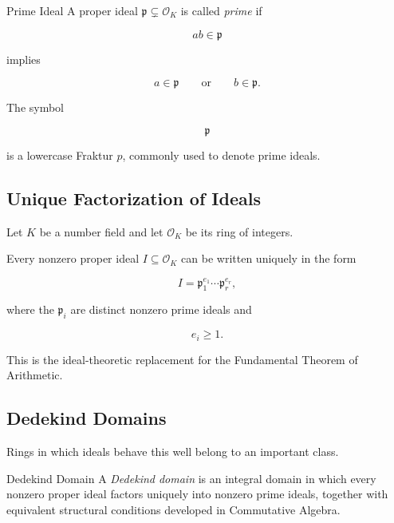 \begin{definitionbox}{Prime Ideal}
A proper ideal \(\mathfrak p\subsetneq\mathcal O_K\) is called
\emph{prime} if

\[ ab\in\mathfrak p \]

implies

\[ a\in\mathfrak p\qquad\text{or}\qquad b\in\mathfrak p. \]
\end{definitionbox}

The symbol

\[ \mathfrak p \]

is a lowercase Fraktur \(p\), commonly used to denote prime ideals.

\subsection{Unique Factorization of Ideals}
\label{subsec:unique-factorization-ideals}

\begin{theorem}
Let \(K\) be a number field and let \(\mathcal O_K\) be its ring of integers.

Every nonzero proper ideal \(I\subseteq\mathcal O_K\) can be written uniquely
in the form

\[ \boxed{I=\mathfrak p_1^{e_1}\cdots\mathfrak p_r^{e_r}}, \]

where the \(\mathfrak p_i\) are distinct nonzero prime ideals and

\[ e_i\geq1. \]
\end{theorem}

This is the ideal-theoretic replacement for the Fundamental Theorem of
Arithmetic.

\subsection{Dedekind Domains}
\label{subsec:dedekind-domains-number-theory}

Rings in which ideals behave this well belong to an important class.

\begin{definitionbox}{Dedekind Domain}
A \emph{Dedekind domain} is an integral domain in which every nonzero proper
ideal factors uniquely into nonzero prime ideals, together with equivalent
structural conditions developed in Commutative Algebra.
\end{definitionbox}

